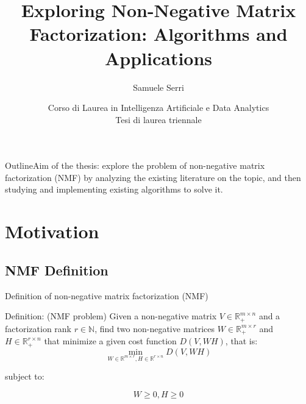 \documentclass{beamer}
\title[Short Paper Title] %
{Exploring Non-Negative Matrix Factorization: Algorithms and Applications}
\subtitle
{}
\author[Author] %
{Samuele Serri}
\institute[Università degli studi di Trieste] %
{
  
  Dipartimento di Matematica Informatica e Geoscienze -- MIGE\\
  Università degli studi di Trieste
}
\date[26/03/2026] %
{Corso di Laurea in Intelligenza Artificiale e Data Analytics \\
\vfill %
\large
{Tesi di laurea triennale}\\}
\newcommand{\R}{\mathbb{R}}
\newcommand{\N}{\mathbb{N}}
\begin{document}
\begin{frame}
  \titlepage
\end{frame}

\begin{frame}{Outline}{Aim of the thesis: explore the problem of non-negative matrix factorization (NMF) by analyzing
the existing literature on the topic, and then studying and implementing existing
algorithms to solve it.}
  \tableofcontents
\end{frame}





\section{Motivation}

\subsection{NMF Definition}

\begin{frame}{Definition of non-negative matrix factorization (NMF)}
\begin{block}{Definition: (NMF problem)}
Given a non-negative matrix $V \in \R_+^{m \times n}$ and a factorization rank $r \in \N$, find two non-negative matrices $W \in \R_+^{m \times r}$ and $H \in \R_+^{r \times n}$ that minimize 
a given cost function $D(V, WH)$, that is:
\begin{equation}
\min_{W \in \R^{m \times r}, H \in \R^{r \times n}} D(V, WH)
\end{equation}
\begin{center}
  subject to:
\end{center}
\begin{equation*}
W \geq 0, H \geq 0
\end{equation*}
\end{block}
\end{frame}
\end{document}
